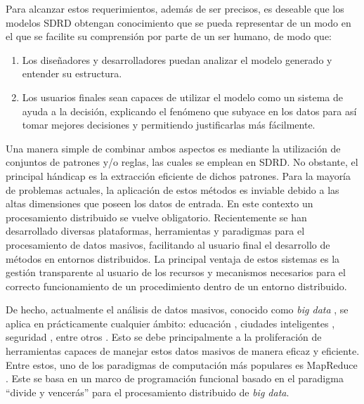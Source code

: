 \documentclass[c5paper,10pt,twoside]{book}	   	%
\begin{document}
Para alcanzar estos requerimientos, además de ser precisos, es deseable que los modelos \ac{SDRD} obtengan conocimiento que se pueda representar de un modo en el que se facilite su comprensión por parte de un ser humano, de modo que: 

\begin{enumerate}
	\item Los diseñadores y desarrolladores puedan analizar el modelo generado y entender su estructura.
	
	\item Los usuarios finales sean capaces de utilizar el modelo como un sistema de ayuda a la decisión, explicando el fenómeno que subyace en los datos para así tomar mejores decisiones y permitiendo justificarlas más fácilmente.
\end{enumerate}

Una manera simple de combinar ambos aspectos es mediante la utilización de conjuntos de patrones y/o reglas, las cuales se emplean en \ac{SDRD}. No obstante, el principal hándicap es la extracción eficiente de dichos patrones. Para la mayoría de problemas actuales, la aplicación de estos métodos es inviable debido a las altas dimensiones que poseen los datos de entrada. En este contexto un procesamiento distribuido se vuelve obligatorio. Recientemente se han desarrollado diversas plataformas, herramientas y paradigmas para el procesamiento de datos masivos, facilitando al usuario final el desarrollo de métodos en entornos distribuidos. La principal ventaja de estos sistemas  es la gestión transparente al usuario de los recursos y mecanismos necesarios para el correcto funcionamiento de un procedimiento dentro de un entorno distribuido.






De hecho, actualmente el análisis de datos masivos, conocido como \textit{big data} \cite{Frlbdbh14}, se aplica en prácticamente cualquier ámbito: educación \cite{Hwhhz19}, ciudades inteligentes \cite{Xclwx16,Sbkt19}, seguridad \cite{Plyyl17}, entre otros \cite{Dlczh18,Btmpgpsp19,Mhzvl19}. Esto se debe principalmente a la proliferación de herramientas capaces de manejar estos datos masivos de manera eficaz y eficiente. Entre estos, uno de los paradigmas de computación más populares es MapReduce \cite{Dg08}. Este se basa en un marco de programación funcional basado en el paradigma ``divide y vencerás'' para el procesamiento distribuido de \textit{big data}. 
\end{document}
